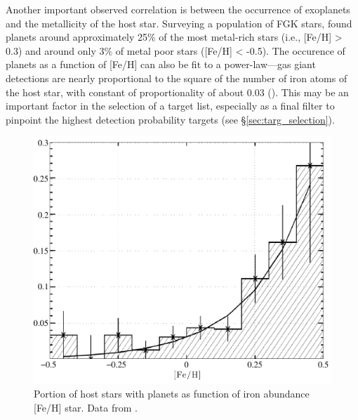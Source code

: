 Another important observed correlation is between the occurrence of exoplanets and the metallicity of the host star.  Surveying a population of  FGK stars, \citet{marcy2005observed} found planets around approximately 25\% of the most metal-rich stars (i.e.,  [Fe/H] > 0.3) and around only 3\% of metal poor stars ([Fe/H] < -0.5).  The occurence of planets as a function of [Fe/H] can also be fit to a power-law---gas giant detections are nearly proportional to the square of the number of iron atoms of the host star, with constant of proportionality of about 0.03 ().  This may be an important factor in the selection of a target list, especially as a final filter to pinpoint the highest detection probability targets (see \S\ref{sec:targ_selection}).

\begin{figure}[ht]
\centering
\includegraphics[width=5.5in]{./figures/marcyFEH}
 \caption[Planet occurence vs metallicity]{ Portion of host stars with planets as function of iron abundance [Fe/H] star. Data from \citet{marcy2005observed}.}
\label{fig:marcyFEH} 
\end{figure} 


